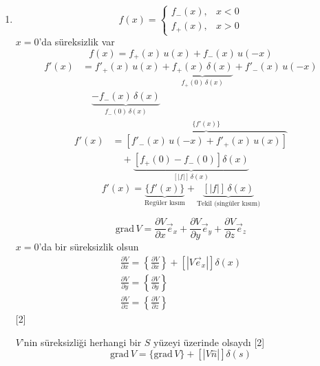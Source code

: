 \documentclass[11pt,a4paper]{article}
\begin{document}
\begin{enumerate}[start=4]
\item
\begin{center}
\end{center}
\[ f(x)=\begin{cases} f_-(x), & x<0\\ f_+(x), & x>0\end{cases} \]
$x=0$'da süreksizlik var
\[ f(x)=f_+(x)\,u(x)+f_-(x)\,u(-x) \]
\begin{align*}
f'(x)&=f'_+(x)\,u(x)+\underbrace{f_+(x)\,\delta(x)}_{f_+(0)\,\delta(x)}+f'_-(x)\,u(-x)\\
&\quad\underbrace{-f_-(x)\,\delta(x)}_{f_-(0)\,\delta(x)}
\end{align*}
\begin{align*}
f'(x)&=\overbrace{\left[f'_-(x)\,u(-x)+f'_+(x)\,u(x)\right]}^{\{f'(x)\}}\\
&\quad+\underbrace{\left[f_+(0)-f_-(0)\right]\delta(x)}_{[|f|]\,\delta(x)}
\end{align*}
\[ f'(x)=\underbrace{\{f'(x)\}}_{\text{Regüler kısım}}+\underbrace{[|f|]\,\delta(x)}_{\text{Tekil (singüler kısım)}} \]

\[ \mathrm{grad}\,V=\frac{\partial V}{\partial x}\vec e_x+\frac{\partial V}{\partial y}\vec e_y+\frac{\partial V}{\partial z}\vec e_z \]
$x=0$'da bir süreksizlik olsun
\begin{gather*}
\frac{\partial V}{\partial x}=\left\{\frac{\partial V}{\partial x}\right\}+\left[|V\vec e_x|\right]\delta(x)\\
\frac{\partial V}{\partial y}=\left\{\frac{\partial V}{\partial y}\right\}\\
\frac{\partial V}{\partial z}=\left\{\frac{\partial V}{\partial z}\right\}
\end{gather*}
[2]

$V$'nin süreksizliği herhangi bir $S$ yüzeyi üzerinde olsaydı
[2]
\[ \mathrm{grad}\,V=\{\mathrm{grad}\,V\}+\left[|V\hat n|\right]\delta(s) \]


\end{enumerate}
\end{document}

